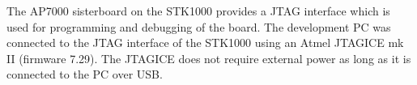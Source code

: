 The AP7000 sisterboard on the STK1000 provides a JTAG interface which is used for programming and debugging of the board.
The development PC was connected to the JTAG interface of the STK1000 using an Atmel JTAGICE mk II (firmware 7.29).
The JTAGICE does not require external power as long as it is connected to the PC over USB.
